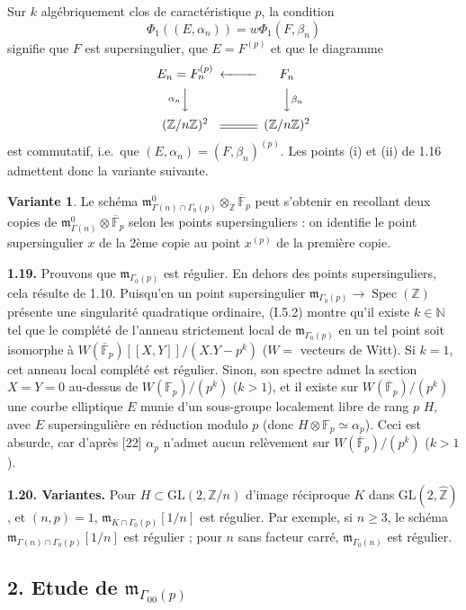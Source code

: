 \documentclass[10pt,a4paper]{amsart}
\theoremstyle{plain}
\theoremstyle{definition}
\newtheorem{variante}[theorem]{Variante}
\DeclareMathOperator{\Spec}{Spec}
\newcommand{\m}{\mathfrak{m}}
\newcommand{\FF}{\mathbb{F}}
\newcommand{\ZZ}{\mathbb{Z}}
\newcommand{\NN}{\mathbb{N}}
\newcommand{\GL}{\mathrm{GL}}
\begin{document}
Sur $k$ alg\'ebriquement clos de caract\'eristique $p$, la condition
\[
\Phi_1((E,\alpha_n)) = w\Phi_1(F,\beta_n)
\]
signifie que $F$ est supersingulier, que $E = F^{(p)}$ et que le diagramme
\[
\begin{CD}
E_n = F_n^{(p)} @<<< F_n \\
@V{\alpha_n}VV @VV{\beta_n}V \\
(\ZZ/n\ZZ)^2 @= (\ZZ/n\ZZ)^2
\end{CD}
\]
est commutatif, i.e.\ que $(E,\alpha_n) = (F,\beta_n)^{(p)}$. Les points (i) et (ii) de 1.16 admettent donc la variante suivante.

\setcounter{theorem}{17}
\begin{variante}
Le sch\'ema $\m_{\Gamma(n) \cap \Gamma_0(p)}^0 \otimes_\ZZ \overline{\FF}_p$ peut s'obtenir en recollant deux copies de $\m_{\Gamma(n)}^0 \otimes \overline{\FF}_p$ selon les points supersinguliers : on identifie le point supersingulier $x$ de la 2\`eme copie au point $x^{(p)}$ de la premi\`ere copie.
\end{variante}

\medskip\noindent\textbf{1.19.} Prouvons que $\m_{\Gamma_0(p)}$ est r\'egulier. En dehors des points supersinguliers, cela r\'esulte de 1.10. Puisqu'en un point supersingulier $\m_{\Gamma_0(p)} \to \Spec(\ZZ)$ pr\'esente une singularit\'e quadratique ordinaire, (I.5.2) montre qu'il existe $k \in \NN$ tel que le compl\'et\'e de l'anneau strictement local de $\m_{\Gamma_0(p)}$ en un tel point soit isomorphe \`a $W(\overline{\FF}_p)[[X,Y]]/(X.Y - p^k)$ ($W =$ vecteurs de Witt). Si $k = 1$, cet anneau local compl\'et\'e est r\'egulier. Sinon, son spectre admet la section $X = Y = 0$ au-dessus de $W(\FF_p)/(p^k)$ ($k > 1$), et il existe sur $W(\overline{\FF}_p)/(p^k)$ une courbe elliptique $E$ munie d'un sous-groupe localement libre de rang $p$ $H$, avec $E$ supersinguli\`ere en r\'eduction modulo $p$ (donc $H \otimes \FF_p \simeq \alpha_p$). Ceci est absurde, car d'apr\`es [22] $\alpha_p$ n'admet aucun rel\`evement sur $W(\overline{\FF}_p)/(p^k)$ ($k > 1$).

\medskip\noindent\textbf{1.20. Variantes.} Pour $H \subset \GL(2,\ZZ/n)$ d'image r\'eciproque $K$ dans $\GL(2,\hat{\ZZ})$, et $(n,p) = 1$, $\m_{K \cap \Gamma_0(p)}[1/n]$ est r\'egulier. Par exemple, si $n \geq 3$, le sch\'ema $\m_{\Gamma(n) \cap \Gamma_0(p)}[1/n]$ est r\'egulier ; pour $n$ sans facteur carr\'e, $\m_{\Gamma_0(n)}$ est r\'egulier.


\subsection*{2. Etude de $\m_{\Gamma_{00}(p)}$}
\end{document}
